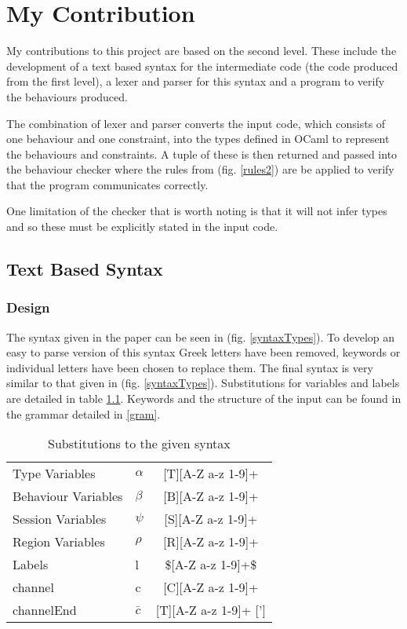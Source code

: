 \chapter{My Contribution} \label{chapMyWork}

My contributions to this project are based on the second level. These include the development of a text based syntax for the intermediate code (the code produced from the first level), a lexer and parser for this syntax and a program to verify the behaviours produced. 

The combination of lexer and parser converts the input code, which consists of one behaviour and one constraint, into the types defined in OCaml to represent the behaviours and constraints. A tuple of these is then returned and passed into the behaviour checker where the rules from (fig. \ref{rules2}) are be applied to verify that the program communicates correctly. 

One limitation of the checker that is worth noting is that it will not infer types and so these must be explicitly stated in the input code. 

\section{Text Based Syntax} \label{text}

\subsection {Design} 
The syntax given in the paper can be seen in (fig. \ref{syntaxTypes}). To develop an easy to parse version of this syntax Greek letters have been removed, keywords or individual letters have been chosen to replace them. The final syntax is very similar to that given in (fig. \ref{syntaxTypes}). Substitutions for variables and labels are detailed in table \ref{tabSyntaxSubs}. Keywords and the structure of the input can be found in the grammar detailed in \ref{gram}.

\begin{table}
\centering
\begin{tabular}{l l c }
Type Variables & $\alpha$ & [T][A-Z a-z 1-9]+ \\
Behaviour Variables &$\beta$ & [B][A-Z a-z 1-9]+ \\
Session Variables & $\psi$ & [S][A-Z a-z 1-9]+ \\
Region Variables & $\rho$ & [R][A-Z a-z 1-9]+ \\
Labels & l & \$[A-Z a-z 1-9]+\$ \\
channel & c & [C][A-Z a-z 1-9]+  \\
channelEnd & $\bar{c}$ &[T][A-Z a-z 1-9]+ ['] \\
\end{tabular}
\caption{Substitutions to the given syntax}
\label{tabSyntaxSubs}
\end{table}

